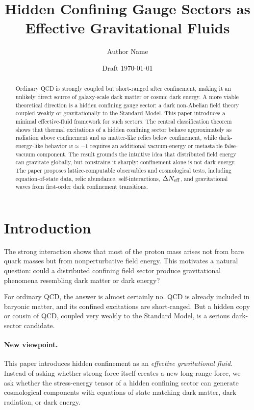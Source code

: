\documentclass[11pt]{article}
\title{Hidden Confining Gauge Sectors as Effective Gravitational Fluids}
\author{Author Name}
\affil{Independent Research Draft}
\date{Draft \today}
\theoremstyle{remark}
\begin{document}
\maketitle

\begin{abstract}
Ordinary QCD is strongly coupled but short-ranged after confinement, making it an unlikely direct source of galaxy-scale dark matter or cosmic dark energy. A more viable theoretical direction is a hidden confining gauge sector: a dark non-Abelian field theory coupled weakly or gravitationally to the Standard Model. This paper introduces a minimal effective-fluid framework for such sectors. The central classification theorem shows that thermal excitations of a hidden confining sector behave approximately as radiation above confinement and as matter-like relics below confinement, while dark-energy-like behavior $w\approx-1$ requires an additional vacuum-energy or metastable false-vacuum component. The result grounds the intuitive idea that distributed field energy can gravitate globally, but constrains it sharply: confinement alone is not dark energy. The paper proposes lattice-computable observables and cosmological tests, including equation-of-state data, relic abundance, self-interactions, $\Delta N_{\rm eff}$, and gravitational waves from first-order dark confinement transitions.
\end{abstract}

\tableofcontents

\section{Introduction}

The strong interaction shows that most of the proton mass arises not from bare quark masses but from nonperturbative field energy. This motivates a natural question: could a distributed confining field sector produce gravitational phenomena resembling dark matter or dark energy?

For ordinary QCD, the answer is almost certainly no. QCD is already included in baryonic matter, and its confined excitations are short-ranged. But a hidden copy or cousin of QCD, coupled very weakly to the Standard Model, is a serious dark-sector candidate.

\paragraph{New viewpoint.} This paper introduces hidden confinement as an \emph{effective gravitational fluid}. Instead of asking whether strong force itself creates a new long-range force, we ask whether the stress-energy tensor of a hidden confining sector can generate cosmological components with equations of state matching dark matter, dark radiation, or dark energy.
\end{document}
